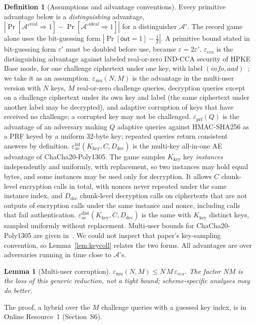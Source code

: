 \documentclass[pdflatex,sn-mathphys-num]{sn-jnl}%
\theoremstyle{plain}
\newtheorem{lemma}[theorem]{Lemma}
\theoremstyle{definition}
\newtheorem{definition}[theorem]{Definition}
\begin{document}
\begin{definition}[Assumptions and advantage conventions]\label{def:assumptions}
Every primitive advantage below is a \emph{distinguishing} advantage, $|\Pr[\mathcal A'^{\mathrm{real}}\Rightarrow1]-\Pr[\mathcal A'^{\mathrm{ideal}}\Rightarrow1]|$ for a distinguisher $\mathcal A'$. The record game alone uses the bit-guessing form $|\Pr[\mathsf{out}=1]-\tfrac12|$. A primitive bound stated in bit-guessing form $\varepsilon'$ must be doubled before use, because $\varepsilon=2\varepsilon'$.
$\varepsilon_{\mathrm{cca}}$ is the distinguishing advantage against labeled real-or-zero IND-CCA security of HPKE Base mode, for one challenge ciphertext under one key, with label $(\mathit{info},\mathit{aad})$~\cite{rfc9180}; we take it as an assumption. $\varepsilon_{\mathrm{mu}}(N,M)$ is the advantage in the multi-user version with $N$ keys, $M$ real-or-zero challenge queries, decryption queries except on a challenge ciphertext under its own key and label (the same ciphertext under another label may be decrypted), and adaptive corruption of keys that have received no challenge; a corrupted key may not be challenged. $\varepsilon_{\mathrm{prf}}(Q)$ is the advantage of an adversary making $Q$ adaptive queries against HMAC-SHA256 as a PRF keyed by a uniform 32-byte key; repeated queries return consistent answers by definition. $\varepsilon^{\mathrm{iid}}_{\mathrm{ae}}(K_{\mathrm{key}},C,D_{\mathrm{dec}})$ is the multi-key all-in-one AE advantage of ChaCha20-Poly1305. The game samples $K_{\mathrm{key}}$ key \emph{instances} independently and uniformly, with replacement, so two instances may hold equal bytes, and some instances may be used only for decryption. It allows $C$ chunk-level encryption calls in total, with nonces never repeated under the same instance index, and $D_{\mathrm{dec}}$ chunk-level decryption calls on ciphertexts that are not outputs of encryption calls under the same instance and nonce, including calls that fail authentication. $\varepsilon^{\mathrm{dist}}_{\mathrm{ae}}(K_{\mathrm{key}},C,D_{\mathrm{dec}})$ is the same with $K_{\mathrm{key}}$ distinct keys, sampled uniformly without replacement. Multi-user bounds for ChaCha20-Poly1305 are given in~\cite{degabriele2021}. We could not inspect that paper's key-sampling convention, so Lemma~\ref{lem:keycoll} relates the two forms. All advantages are over adversaries running in time close to $\mathcal A$'s.
\end{definition}

\begin{lemma}[Multi-user corruption]\label{lem:mu}
$\varepsilon_{\mathrm{mu}}(N,M)\le N\,M\,\varepsilon_{\mathrm{cca}}$. The factor $NM$ is the loss of this generic reduction, not a tight bound; scheme-specific analyses may do better.
\end{lemma}
The proof, a hybrid over the $M$ challenge queries with a guessed key index, is in Online Resource~1 (Section~S6).
\end{document}
